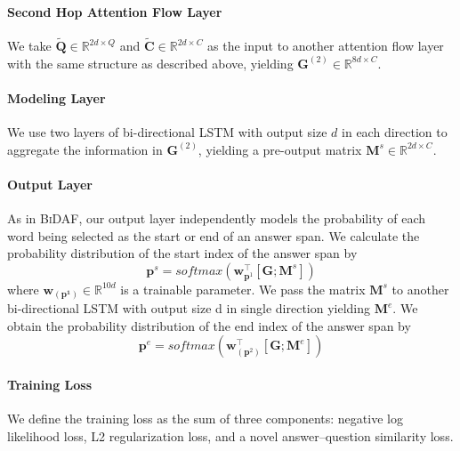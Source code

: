 \documentclass[11pt,letterpaper]{article}
\begin{document}
\paragraph{Second Hop Attention Flow Layer} We take $\tilde{\bm{Q}}  \in \mathbb{R}^{2d\times Q}$ and $\tilde{\bm{C}}  \in \mathbb{R}^{2d\times C}$ as the input to another attention flow layer with the same structure as described above, yielding $\bm{G}^{(2)} \in \mathbb{R}^{8d\times C}$. 

\paragraph{Modeling Layer} We use two layers of bi-directional LSTM with output size $d$ in each direction to aggregate the information in $\bm{G}^{(2)}$, yielding a pre-output matrix $\bm{M}^s \in \mathbb{R}^{2d\times C}$. 

\paragraph{Output Layer} As in \textsc{BiDAF}, our output layer independently models the probability of each word being selected as the start or end of an answer span. We calculate the probability distribution of the start index of the answer span by 
\begin{equation}
\bm{p}^s = softmax(\bm{w}^{\top}_{\bm{p}^1}[\bm{G};\bm{M}^s])
\end{equation}
where $\bm{w}_{(\bm{p^1})}\in \mathbb{R}^{10d}$ is a trainable parameter. We pass the matrix $\bm{M}^s$ to another bi-directional LSTM with output size d in single direction yielding $\bm{M}^e$. We obtain the probability distribution of the end index of the answer span by
\begin{equation}
\bm{p}^e = softmax(\bm{w}^{\top}_{(\bm{p}^2)}[ \bm{G};\bm{M}^e])
\end{equation}


\paragraph{Training Loss} We define the training loss as the sum of three components: negative log likelihood loss,  L2 regularization loss, and a novel answer--question similarity loss.
\end{document}
